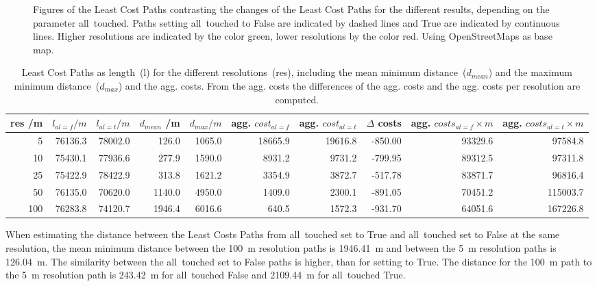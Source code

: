 \begin{figure}
	\centering

	\qquad

	\caption{Figures of the Least Cost Paths contrasting the changes of the Least Cost Paths for the different results, depending on the parameter all~touched. Paths setting all~touched to False are indicated by dashed lines and True are indicated by continuous lines. Higher resolutions are indicated by the color green, lower resolutions by the color red. Using OpenStreetMaps as base map.}
	\label{fig:paths_alltouched}
\end{figure}

\begin{table*}[t]
	\caption{Least Cost Paths as length~(l) for the different resolutions~(res), including the mean minimum distance~($d_{mean}$) and the maximum minimum distance~($d_{max}$) and the agg. costs. From the agg. costs the differences of the agg. costs and the agg. costs per resolution are computed.} 
	\label{tab:2}
	\centering
	\begin{tabular}{ r  r  r  r  r  r  r  r  r  r}
		res /m & $l_{al=f} /m$ & $l_{al=t} /m$ & $d_{mean}$ /m & $d_{max}/m$ & agg.  $ cost_{al=f}$ & agg. $ cost_{al=t}$ &  $\Delta $ costs & agg. $costs_{al=f} \times m$ & agg. $costs_{al=t} \times m$ \\
		\hline
		5 	& 76136.3	& 78002.0 &  126.0 & 1065.0 & 18665.9 & 19616.8 & -850.00 & 93329.6 &  97584.8 \\
		10 	& 75430.1 	& 77936.6 &  277.9 & 1590.0 &  8931.2 &  9731.2 & -799.95 & 89312.5 &  97311.8 \\
		25 	& 75422.9 	& 78422.9 &  313.8 & 1621.2 &  3354.9 &  3872.7 & -517.78 & 83871.7 &  96816.4 \\
		50 	& 76135.0	& 70620.0 & 1140.0 & 4950.0 &  1409.0 &  2300.1 & -891.05 & 70451.2 & 115003.7 \\
		100 & 76283.8	& 74120.7 & 1946.4 & 6016.6 &   640.5 &  1572.3 & -931.70 & 64051.6 & 167226.8 \\

	\end{tabular}
\end{table*}

When estimating the distance between the Least Costs Paths from all~touched set to True and all~touched set to False at the same resolution, 
the mean minimum distance between the 100~m resolution paths is 1946.41~m and between the 5~m resolution paths is 126.04~m.
The similarity between the all~touched set to False paths is higher, than for setting to True.
The distance for the 100~m path to the 5~m resolution path is 243.42~m for all~touched False and 2109.44~m for all~touched True.

